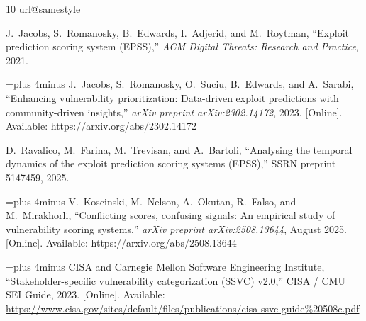 \documentclass[journal]{IEEEtran}
\begin{document}
\begin{thebibliography}{10}
\providecommand{\url}[1]{#1}
\csname url@samestyle\endcsname
\providecommand{\newblock}{\relax}
\providecommand{\bibinfo}[2]{#2}
\providecommand{\BIBentrySTDinterwordspacing}{\spaceskip=0pt\relax}
\providecommand{\BIBentryALTinterwordstretchfactor}{4}
\providecommand{\BIBentryALTinterwordspacing}{\spaceskip=\fontdimen2\font plus
\BIBentryALTinterwordstretchfactor\fontdimen3\font minus
  \fontdimen4\font\relax}
\providecommand{\BIBforeignlanguage}[2]{{%
\expandafter\ifx\csname l@#1\endcsname\relax
\typeout{** WARNING: IEEEtran.bst: No hyphenation pattern has been}%
\typeout{** loaded for the language `#1'. Using the pattern for}%
\typeout{** the default language instead.}%
\else
\language=\csname l@#1\endcsname
\fi
#2}}
\providecommand{\BIBdecl}{\relax}
\BIBdecl

J.~Jacobs, S.~Romanosky, B.~Edwards, I.~Adjerid, and M.~Roytman, ``Exploit
  prediction scoring system ({EPSS}),'' \emph{ACM Digital Threats: Research and
  Practice}, 2021.

\BIBentryALTinterwordspacing
J.~Jacobs, S.~Romanosky, O.~Suciu, B.~Edwards, and A.~Sarabi, ``Enhancing
  vulnerability prioritization: Data-driven exploit predictions with
  community-driven insights,'' \emph{arXiv preprint arXiv:2302.14172}, 2023.
  [Online]. Available: \url{https://arxiv.org/abs/2302.14172}
\BIBentrySTDinterwordspacing

D.~Ravalico, M.~Farina, M.~Trevisan, and A.~Bartoli, ``Analysing the temporal
  dynamics of the exploit prediction scoring systems ({EPSS}),'' SSRN preprint
  5147459, 2025.

\BIBentryALTinterwordspacing
V.~Koscinski, M.~Nelson, A.~Okutan, R.~Falso, and M.~Mirakhorli, ``Conflicting
  scores, confusing signals: An empirical study of vulnerability scoring
  systems,'' \emph{arXiv preprint arXiv:2508.13644}, August 2025. [Online].
  Available: \url{https://arxiv.org/abs/2508.13644}
\BIBentrySTDinterwordspacing

\BIBentryALTinterwordspacing
{CISA} and {Carnegie Mellon Software Engineering Institute},
  ``Stakeholder-specific vulnerability categorization ({SSVC}) v2.0,'' CISA /
  CMU SEI Guide, 2023. [Online]. Available:
  \url{https://www.cisa.gov/sites/default/files/publications/cisa-ssvc-guide%20508c.pdf}
\BIBentrySTDinterwordspacing


\end{thebibliography}
\end{document}
